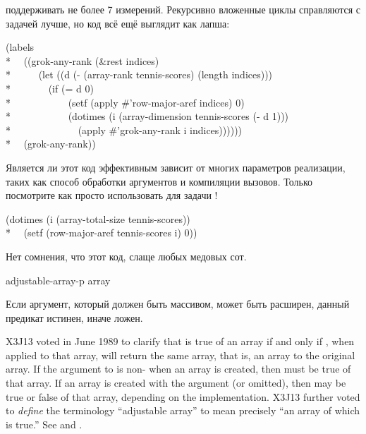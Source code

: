 \begin{defun}[Функция]
поддерживать не более 7 измерений. Рекурсивно вложенные циклы справляются с
задачей лучше, но код всё ещё выглядит как лапша:
\begin{lisp}
(labels \\*
~~((grok-any-rank (\&rest indices) \\*
~~~~~(let ((d (- (array-rank tennis-scores) (length indices))) \\*
~~~~~~~(if (= d 0) \\*
~~~~~~~~~~~(setf (apply \#'row-major-aref indices) 0) \\*
~~~~~~~~~~~(dotimes (i (array-dimension tennis-scores (- d 1))) \\*
~~~~~~~~~~~~~(apply \#'grok-any-rank i indices)))))) \\*
~~(grok-any-rank))
\end{lisp}
Является ли этот код эффективным зависит от многих параметров реализации, таких
как способ обработки  аргументов и компиляции  вызовов.
Только посмотрите как просто использовать для задачи !
\begin{lisp}
(dotimes (i (array-total-size tennis-scores)) \\*
~~(setf (row-major-aref tennis-scores i) 0))
\end{lisp}
Нет сомнения, что этот код, слаще любых медовых сот.
\end{defun}

\begin{defun}[Функция]
adjustable-array-p array

Если аргумент, который должен быть массивом, может быть расширен, данный
предикат истинен, иначе ложен.

\begin{newer}
X3J13 voted in June 1989
to clarify that  is true of an array
if and only if , when applied to that array,
will return the same array, that is, an array  to the original array.
If the  argument
to  is non- when an array is created,
then  must be true of that array.
If an array is created with the  argument 
(or omitted), then  may be true or false of that
array, depending on the implementation.
X3J13 further voted to \emph{define}
the terminology ``adjustable array'' to mean precisely ``an array of
which  is true.''
See  and .
\end{newer}
\end{defun}

